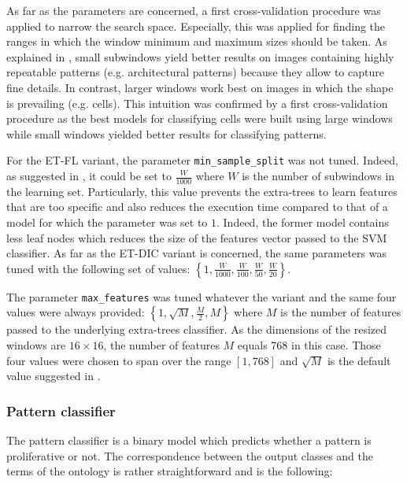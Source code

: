 As far as the parameters are concerned, a first cross-validation procedure was applied to narrow the search space. Especially, this was applied for finding the ranges in which the window minimum and maximum sizes should be taken. As explained in \cite{Maree201617}, small subwindows yield better results on images containing highly repeatable patterns (e.g. architectural patterns) because they allow to capture fine details. In contrast, larger windows work best on images in which the shape is prevailing (e.g. cells). This intuition was confirmed by a first cross-validation procedure as the best models for classifying cells were built using large windows while small windows yielded better results for classifying patterns.

For the ET-FL variant, the parameter \texttt{min\_sample\_split} was not tuned. Indeed, as suggested in \cite{Maree201617}, it could be set to $\frac{W}{1000}$ where $W$ is the number of subwindows in the learning set. Particularly, this value prevents the extra-trees to learn features that are too specific and also reduces the execution time compared to that of a model for which the parameter was set to $1$. Indeed, the former model contains less leaf nodes which reduces the size of the features vector passed to the SVM classifier. As far as the ET-DIC variant is concerned, the same parameters was tuned with the following set of values: $\left\{1, \frac{W}{1000}, \frac{W}{100}, \frac{W}{50}, \frac{W}{20} \right\}$.

The parameter \texttt{max\_features} was tuned whatever the variant and the same four values were always provided: $\left\{1, \sqrt{M}, \frac{M}{2}, M\right\}$ where $M$ is the number of features passed to the underlying extra-trees classifier. As the dimensions of the resized windows are $16\times 16$, the number of features $M$ equals 768 in this case. Those four values were chosen to span over the range $[1, 768]$ and $\sqrt{M}$ is the default value suggested in \cite{Geurts2006}. 

\subsubsection{Pattern classifier}
\label{sssec:thyroid_pattern_model}
The pattern classifier is a binary model which predicts whether a pattern is proliferative or not. The correspondence between the output classes and the terms of the ontology is rather straightforward and is the following:

